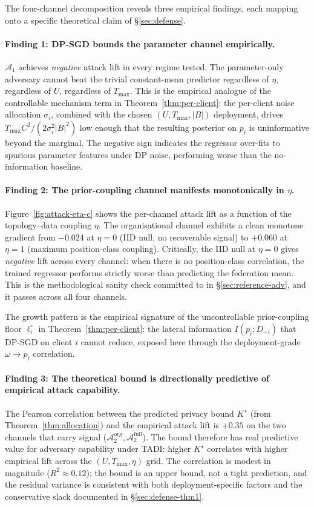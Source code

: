 \documentclass[letterpaper,journal]{IEEEtran}
\newcommand{\TADI}{\textsc{TADI}\xspace}
\newcommand{\Adv}{\mathcal{A}}
\newcommand{\Tmax}{T_{\max}}
\begin{document}
The four-channel decomposition reveals three empirical findings,
each mapping onto a specific theoretical claim of \S\ref{sec:defense}.

\paragraph{Finding 1: DP-SGD bounds the parameter channel empirically.}
$\Adv_1$ achieves \emph{negative} attack lift in every regime tested.
The parameter-only adversary cannot beat the trivial constant-mean
predictor regardless of $\eta$, regardless of $U$, regardless of
$\Tmax$. This is the empirical analogue of the controllable mechanism
term in Theorem~\ref{thm:per-client}: the per-client noise allocation
$\sigma_i$, combined with the chosen $(U, \Tmax, |B|)$ deployment,
drives $T_{\max} C^2/(2\sigma_i^2|B|^2)$ low enough that the resulting
posterior on $p_i$ is uninformative beyond the marginal. The negative
sign indicates the regressor over-fits to spurious parameter features
under DP noise, performing worse than the no-information baseline.

\paragraph{Finding 2: The prior-coupling channel manifests monotonically in $\eta$.}
Figure~\ref{fig:attack-eta-c} shows the per-channel attack lift as a
function of the topology--data coupling $\eta$. The organisational
channel exhibits a clean monotone gradient from $-0.024$ at $\eta=0$
(IID null, no recoverable signal) to $+0.060$ at $\eta=1$ (maximum
position-class coupling). Critically, the IID null at $\eta=0$ gives
\emph{negative} lift across every channel: when there is no
position-class correlation, the trained regressor performs strictly
worse than predicting the federation mean. This is the methodological
sanity check committed to in \S\ref{sec:reference-adv}, and it passes
across all four channels.

The growth pattern is the empirical signature of the uncontrollable
prior-coupling floor $\ell_i^\circ$ in Theorem~\ref{thm:per-client}:
the lateral information $I(p_i; D_{-i})$ that DP-SGD on client $i$
cannot reduce, exposed here through the deployment-grade
$\omega \to p_i$ correlation.

\paragraph{Finding 3: The theoretical bound is directionally predictive of empirical attack capability.}
The Pearson correlation between the predicted privacy bound $K^\star$
(from Theorem~\ref{thm:allocation}) and the empirical attack lift is
$+0.35$ on the two channels that carry signal
($\Adv_2^{\text{org}}, \Adv_2^{\text{full}}$). The bound therefore has
real predictive value for adversary capability under \TADI: higher
$K^\star$ correlates with higher empirical lift across the
$(U, \Tmax, \eta)$ grid. The correlation is modest in magnitude
($R^2 \approx 0.12$); the bound is an upper bound, not a tight
prediction, and the residual variance is consistent with both
deployment-specific factors and the conservative slack documented in
\S\ref{sec:defense-thm1}.
\end{document}
